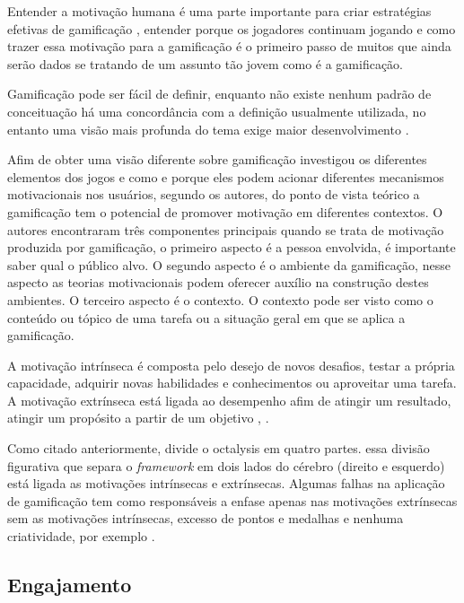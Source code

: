 Entender a motivação humana é uma parte importante para criar estratégias efetivas de gamificação \cite{kumar2013gamification}, entender porque os jogadores continuam jogando e como trazer essa motivação para a gamificação é o primeiro passo de muitos que ainda serão dados se tratando de um assunto tão jovem como é a gamificação.

Gamificação pode ser fácil de definir, enquanto não existe nenhum padrão de conceituação há uma concordância com a definição usualmente utilizada, no entanto uma visão mais profunda do tema exige maior desenvolvimento \cite{seaborn2015gamification}. 

Afim de obter uma visão diferente sobre gamificação  \cite{sailer2013psychological} investigou os diferentes elementos dos jogos  e como e porque eles podem acionar diferentes mecanismos motivacionais nos usuários, segundo os autores, do ponto de vista teórico  a gamificação tem o potencial de promover motivação em diferentes contextos. O autores encontraram três componentes principais quando se trata de motivação produzida por gamificação, o primeiro aspecto é a pessoa envolvida, é importante saber qual o público alvo. O segundo aspecto é o ambiente da gamificação, nesse aspecto as teorias motivacionais podem oferecer auxílio na construção destes ambientes. O terceiro aspecto é o contexto. O contexto pode ser visto como o conteúdo ou tópico de uma tarefa ou a situação geral em que se aplica a gamificação.

A motivação intrínseca é composta pelo desejo de novos desafios, testar a própria capacidade, adquirir novas habilidades e conhecimentos ou aproveitar uma tarefa. A motivação extrínseca está ligada ao desempenho afim de atingir um resultado, atingir um propósito a partir de um objetivo \cite{maican2016interactivia}, \cite{chou2015actionable}.


Como citado anteriormente, \cite{chou2015actionable} divide o octalysis em quatro partes. essa divisão figurativa que separa o \textit{framework} em dois lados do cérebro (direito e esquerdo) está ligada as motivações intrínsecas e extrínsecas. Algumas falhas na aplicação de gamificação tem como responsáveis a enfase apenas nas motivações extrínsecas sem as motivações intrínsecas, excesso de pontos e medalhas e nenhuma criatividade, por exemplo \cite{maican2016interactivia}.

\subsection{Engajamento}

